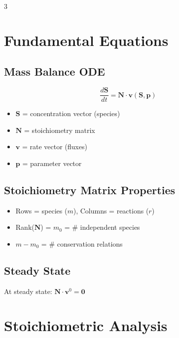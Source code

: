 \documentclass[10pt,landscape,letter]{article}
\begin{document}
\begin{multicols}{3}

\section{Fundamental Equations}

\subsection{Mass Balance ODE}
\begin{equation*}
\frac{d\mathbf{S}}{dt} = \mathbf{N} \cdot \mathbf{v}(\mathbf{S}, \mathbf{p})
\end{equation*}
\begin{itemize}
\item $\mathbf{S}$ = concentration vector (species)
\item $\mathbf{N}$ = stoichiometry matrix
\item $\mathbf{v}$ = rate vector (fluxes)
\item $\mathbf{p}$ = parameter vector
\end{itemize}

\subsection{Stoichiometry Matrix Properties}
\begin{itemize}
\item Rows = species ($m$), Columns = reactions ($r$)
\item Rank($\mathbf{N}$) = $m_0$ = \# independent species
\item $m - m_0$ = \# conservation relations
\end{itemize}

\subsection{Steady State}
At steady state: $\mathbf{N} \cdot \mathbf{v}^0 = \mathbf{0}$

\section{Stoichiometric Analysis}


\end{multicols}
\end{document}
